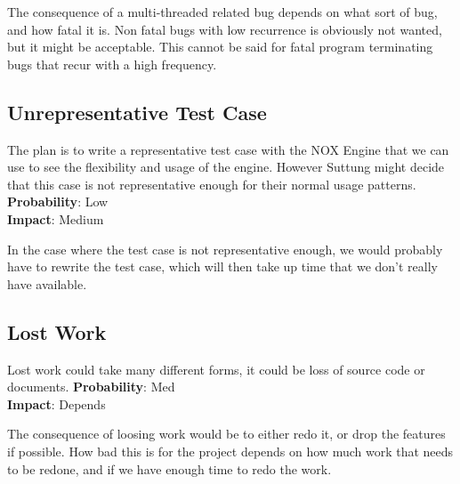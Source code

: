 The consequence of a multi-threaded related bug depends on what sort of bug, 
and how fatal it is. Non fatal bugs with low recurrence is obviously not wanted,
but it might be acceptable. This cannot be said for fatal program terminating bugs
that recur with a high frequency.

\subsection*{Unrepresentative Test Case}
The plan is to write a representative test case with the NOX Engine that we can use
to see the flexibility and usage of the engine. However Suttung might decide that this
case is not representative enough for their normal usage patterns.
\textbf{Probability}: Low\\
\textbf{Impact}: Medium

In the case where the test case is not representative enough, we would probably have to
rewrite the test case, which will then take up time that we don't really have available.

\subsection*{Lost Work}
Lost work could take many different forms, it could be loss of source code or documents.
\textbf{Probability}: Med\\
\textbf{Impact}: Depends

The consequence of loosing work would be to either redo it, or drop the features if possible.
How bad this is for the project depends on how much work that needs to be redone, and
if we have enough time to redo the work.